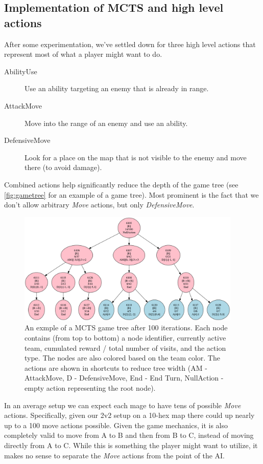 \subsection{Implementation of MCTS and high level actions}

After some experimentation, we've settled down for three high level actions
that represent most of what a player might want to do.

\begin{description}
\item [AbilityUse] Use an ability targeting an enemy that is already in range.
\item [AttackMove] Move into the range of an enemy and use an ability.
\item [DefensiveMove] Look for a place on the map that is not visible to the enemy and move there (to avoid damage).
\end{description}

Combined actions help significantly reduce the depth of the game tree (see \autoref{fig:gametree} for an example of a game tree). Most
prominent is the fact that we don't allow arbitrary \emph{Move} actions, but
only \emph{DefensiveMove}.

\begin{figure}
	\centering
	\includegraphics[width=0.95\textwidth]{img/game-tree.png}
	\caption{An exmple of a MCTS game tree after 100 iterations. Each node
contains (from top to bottom) a node identifier, currently active team,
cumulated reward / total number of visits, and the action type. The nodes are
also colored based on the team color. The actions are shown in shortcuts to
reduce tree width (AM - AttackMove, D - DefensiveMove, End - End Turn,
NullAction - empty action representing the root node).}\label{fig:gametree}
\end{figure}

In an average setup we can expect each mage to have tens of possible
\emph{Move} actions. Specifically, given our 2v2 setup on a 10-hex map there
could up nearly up to a 100 move actions possible. Given the game mechanics, it
is also completely valid to move from A to B and then from B to C, instead of
moving directly from A to C. While this is something the player might want to
utilize, it makes no sense to separate the \emph{Move} actions from the point
of the AI\@.

